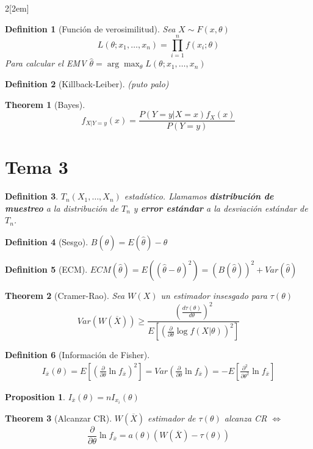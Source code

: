 \documentclass[leqno]{article}
\newtheorem*{theorem}{Theorem}
\newtheorem*{proposition}{Proposition}
\newtheorem*{definition}{Definition}
\begin{document}
\begin{multicols}{2}[\columnsep2em]
\begin{definition}[Función de verosimilitud]
Sea $X \sim F(x,\theta)$
\[
L(\theta; x_1, \ldots, x_n) = \prod_{i=1}^{n} f(x_i;\theta)
\] 
Para calcular el EMV $\hat{\theta }=\arg \max_{\theta } L(\theta ; x_1,\ldots,x_n)$
\end{definition}

\begin{definition}[Killback-Leiber] (puto palo)

\end{definition}

\begin{theorem}[Bayes]
  \[
  f_{X|Y=y}(x)= \frac{P(Y=y|X=x)f_X(x)}{P(Y=y)}
  \] 

\end{theorem}

\section{Tema 3}
\begin{definition} $T_n(X_1,\ldots, X_n)$ estadístico. Llamamos \textbf{distribución de muestreo} a la distribución de $T_n$ y  \textbf{error estándar} a la desviación estándar de $T_n$.
\end{definition}
\begin{definition}[Sesgo]
$B(\hat{\theta })=E(\hat{\theta })-\theta$
\end{definition}

\begin{definition}[ECM] $ECM(\hat{\theta })=E((\hat{\theta }-\theta )^2) = (B(\hat{\theta }))^2+ Var(\hat{\theta})$
\end{definition}

\begin{theorem}[Cramer-Rao] Sea $W(X)$ un estimador insesgado para $\tau (\theta )$
  \[
	Var(W(\overline{X}))\ge \frac{\left(\frac{d \tau (\theta )}{d \theta } \right)^2}{E\left[ \left( \frac{\partial}{\partial\theta } \log f(X|\theta ) \right)^2 \right]}
  \] 
\end{theorem}

\begin{definition}[Información de Fisher]
  \begin{align*}
  I_{\overline{x}}(\theta ) = E\left[ \left(  \frac{\partial}{\partial \theta } \ln f_{\overline{x}} \right) ^2 \right]  = Var\left(\frac{\partial}{\partial \theta }\ln f_{\overline{x}}\right) =  -E\left[  \frac{\partial^2}{\partial \theta ^2} \ln f_{\overline{x}} \right]
  \end{align*}
\end{definition}

\begin{proposition} $I_{\overline{x}}(\theta ) = nI_{x_i}(\theta )$
\end{proposition}

\begin{theorem}[Alcanzar CR] $W(\overline{X})$ estimador de $\tau (\theta )$ alcanza CR  $\iff$
\[
\frac{\partial}{\partial \theta } \ln f_{\overline{x}} = a(\theta )(W(\overline{X})-\tau (\theta ))
\] 
\end{theorem}

\end{multicols}
\end{document}
